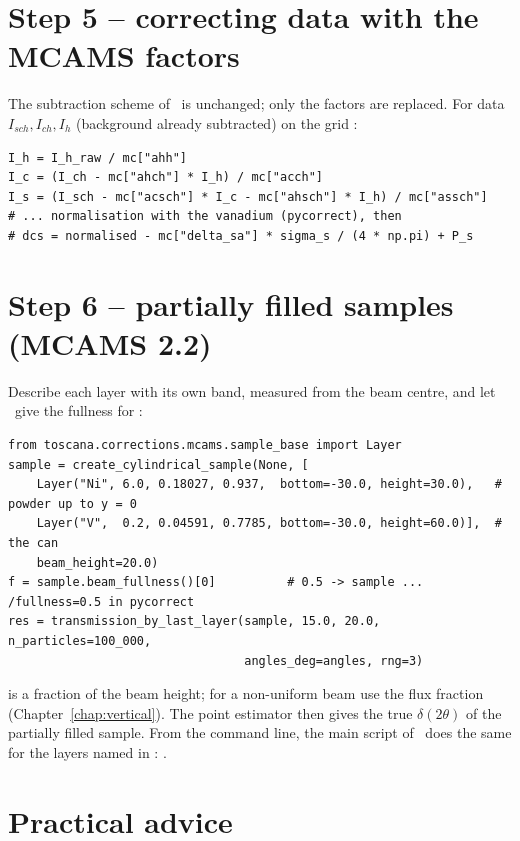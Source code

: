 \documentclass[11pt,a4paper]{report}
\begin{document}
\section{Step 5 -- correcting data with the MCAMS factors}

The subtraction scheme of \cor\ is unchanged; only the factors are replaced.
For data $I_{sch}, I_{ch}, I_h$ (background already subtracted) on the grid
:

\begin{lstlisting}
I_h = I_h_raw / mc["ahh"]
I_c = (I_ch - mc["ahch"] * I_h) / mc["acch"]
I_s = (I_sch - mc["acsch"] * I_c - mc["ahsch"] * I_h) / mc["assch"]
# ... normalisation with the vanadium (pycorrect), then
# dcs = normalised - mc["delta_sa"] * sigma_s / (4 * np.pi) + P_s
\end{lstlisting}

\section{Step 6 -- partially filled samples (MCAMS 2.2)}

Describe each layer with its own band, measured from the beam centre, and let
\mcams\ give the fullness for \pyc:
\begin{lstlisting}
from toscana.corrections.mcams.sample_base import Layer
sample = create_cylindrical_sample(None, [
    Layer("Ni", 6.0, 0.18027, 0.937,  bottom=-30.0, height=30.0),   # powder up to y = 0
    Layer("V",  0.2, 0.04591, 0.7785, bottom=-30.0, height=60.0)],  # the can
    beam_height=20.0)
f = sample.beam_fullness()[0]          # 0.5 -> sample ... /fullness=0.5 in pycorrect
res = transmission_by_last_layer(sample, 15.0, 20.0, n_particles=100_000,
                                 angles_deg=angles, rng=3)
\end{lstlisting}
 is a fraction of the beam height; for a non-uniform beam
use the flux fraction (Chapter~\ref{chap:vertical}). The point estimator then
gives the true $\delta(2\theta)$ of the partially filled sample. From the
command line, the main script of \mcams\ does the same for the layers named in
: .

\section{Practical advice}
\end{document}
